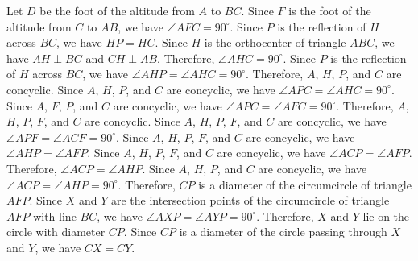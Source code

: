 Let $D$ be the foot of the altitude from $A$ to $BC$.
Since $F$ is the foot of the altitude from $C$ to $AB$, we have $\angle AFC = 90^\circ$.
Since $P$ is the reflection of $H$ across $BC$, we have $HP = HC$.
Since $H$ is the orthocenter of triangle $ABC$, we have $AH \perp BC$ and $CH \perp AB$.
Therefore, $\angle AHC = 90^\circ$.
Since $P$ is the reflection of $H$ across $BC$, we have $\angle AHP = \angle AHC = 90^\circ$.
Therefore, $A$, $H$, $P$, and $C$ are concyclic.
Since $A$, $H$, $P$, and $C$ are concyclic, we have $\angle APC = \angle AHC = 90^\circ$.
Since $A$, $F$, $P$, and $C$ are concyclic, we have $\angle APC = \angle AFC = 90^\circ$.
Therefore, $A$, $H$, $P$, $F$, and $C$ are concyclic.
Since $A$, $H$, $P$, $F$, and $C$ are concyclic, we have $\angle APF = \angle ACF = 90^\circ$.
Since $A$, $H$, $P$, $F$, and $C$ are concyclic, we have $\angle AHP = \angle AFP$.
Since $A$, $H$, $P$, $F$, and $C$ are concyclic, we have $\angle ACP = \angle AFP$.
Therefore, $\angle ACP = \angle AHP$.
Since $A$, $H$, $P$, and $C$ are concyclic, we have $\angle ACP = \angle AHP = 90^\circ$.
Therefore, $CP$ is a diameter of the circumcircle of triangle $AFP$.
Since $X$ and $Y$ are the intersection points of the circumcircle of triangle $AFP$ with line $BC$, we have $\angle AXP = \angle AYP = 90^\circ$.
Therefore, $X$ and $Y$ lie on the circle with diameter $CP$.
Since $CP$ is a diameter of the circle passing through $X$ and $Y$, we have $CX = CY$.
